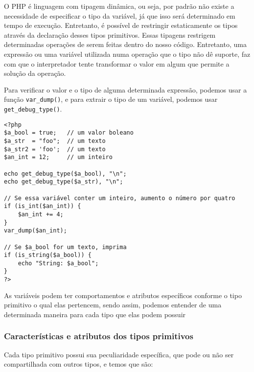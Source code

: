 \documentclass[12pt a4paper]{paper}
\begin{document}
O PHP é linguagem com tipagem dinâmica, ou seja, por padrão não existe a necessidade de especificar o tipo da variável,
 já que isso será determinado em tempo de execução. Entretanto, é possível de restringir estaticamente os tipos através 
 da declaração desses tipos primitivos. Essas tipagens restrigem determinadas operações de serem feitas dentro do nosso 
 código. Entretanto, uma expressão ou uma variável utilizada numa operação que o tipo não dê suporte, faz com que o 
 interpretador tente transformar o valor em algum que permite a solução da operação.

Para verificar o valor e o tipo de alguma determinada expressão, podemos usar a função \texttt{var\_dump()}, e para
extrair o tipo de um variável, podemos usar \texttt{get\_debug\_type()}.

\begin{verbatim}    
<?php
$a_bool = true;   // um valor boleano
$a_str  = "foo";  // um texto
$a_str2 = 'foo';  // um texto
$an_int = 12;     // um inteiro

echo get_debug_type($a_bool), "\n";
echo get_debug_type($a_str), "\n";

// Se essa variável conter um inteiro, aumento o número por quatro
if (is_int($an_int)) {
    $an_int += 4;
}
var_dump($an_int);

// Se $a_bool for um texto, imprima
if (is_string($a_bool)) {
    echo "String: $a_bool";
}
?>
\end{verbatim}

As variáveis podem ter comportamentos e atributos específicos conforme o tipo primitivo o qual elas pertencem, 
sendo assim, podemos entender de uma determinada maneira para cada tipo que elas podem possuir

\subsubsection{Características e atributos dos tipos primitivos}
Cada tipo primitivo possui sua peculiaridade específica, que pode ou não ser compartilhada com outros tipos, e temos 
que são:
\end{document}
